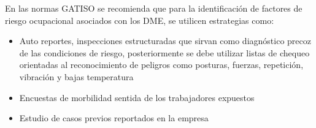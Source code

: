 






En las normas GATISO se recomienda que para la identificación de factores de riesgo ocupacional asociados con los DME, se utilicen estrategias como:
\begin{itemize}
    \item Auto reportes, inspecciones estructuradas que sirvan como diagnóstico precoz de las condiciones de riesgo, posteriormente se debe utilizar listas de chequeo orientadas al reconocimiento de peligros como posturas, fuerzas, repetición, vibración y bajas temperatura
    \item Encuestas de morbilidad sentida de los trabajadores expuestos
    \item Estudio de casos previos reportados en la empresa
\end{itemize}

